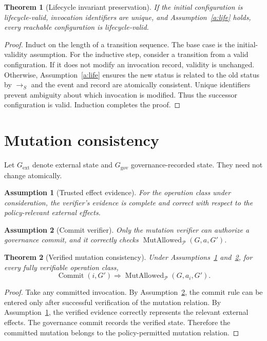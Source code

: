 \documentclass[11pt,a4paper]{article}
\newtheorem{assumption}{Assumption}[section]
\newtheorem{theorem}{Theorem}[section]
\theoremstyle{remark}
\newcommand{\Commit}{\operatorname{Commit}}
\newcommand{\MutAllowed}{\operatorname{MutAllowed}}
\begin{document}
\begin{theorem}[Lifecycle invariant preservation]\label{thm:lifecycle}
If the initial configuration is lifecycle-valid, invocation identifiers are unique, and Assumption~\ref{a:life} holds, every reachable configuration is lifecycle-valid.
\end{theorem}

\begin{proof}
Induct on the length of a transition sequence. The base case is the initial-validity assumption. For the inductive step, consider a transition from a valid configuration. If it does not modify an invocation record, validity is unchanged. Otherwise, Assumption~\ref{a:life} ensures the new status is related to the old status by $\rightarrow_S$ and the event and record are atomically consistent. Unique identifiers prevent ambiguity about which invocation is modified. Thus the successor configuration is valid. Induction completes the proof.
\end{proof}

\section{Mutation consistency}

Let $G_{\mathrm{ext}}$ denote external state and $G_{\mathrm{gov}}$ governance-recorded state. They need not change atomically.

\begin{assumption}[Trusted effect evidence]\label{a:evidence}
For the operation class under consideration, the verifier's evidence is complete and correct with respect to the policy-relevant external effects.
\end{assumption}

\begin{assumption}[Commit verifier]\label{a:verifier}
Only the mutation verifier can authorize a governance commit, and it correctly checks $\MutAllowed_{\mathcal P}(G,a,G')$.
\end{assumption}

\begin{theorem}[Verified mutation consistency]\label{thm:mutation}
Under Assumptions~\ref{a:evidence} and~\ref{a:verifier}, for every fully verifiable operation class,
\[
\Commit(i,G')\Rightarrow
\MutAllowed_{\mathcal P}(G,a_i,G').
\]
\end{theorem}

\begin{proof}
Take any committed invocation. By Assumption~\ref{a:verifier}, the commit rule can be entered only after successful verification of the mutation relation. By Assumption~\ref{a:evidence}, the verified evidence correctly represents the relevant external effects. The governance commit records the verified state. Therefore the committed mutation belongs to the policy-permitted mutation relation.
\end{proof}
\end{document}

